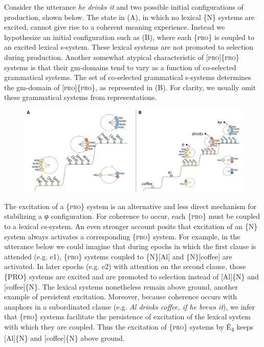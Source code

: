    Consider the utterance \textit{he drinks it} and two possible initial configurations of production, shown below. The state in (A), in which no lexical \{N\} systems are excited, cannot give rise to a coherent meaning experience. Instead we hypothesize an initial configuration such as (B), where each \{\textsc{pro}\} is coupled to an excited lexical s-system. These lexical systems are not promoted to selection during production. Another somewhat atypical characteristic of [\textsc{pro}]\{\textsc{pro}\} systems is that their gm-domains tend to vary as a function of co-selected grammatical systems. The set of co-selected grammatical s-systems determines the gm-domain of [\textsc{pro}]\{\textsc{pro}\}, as represented in (B). For clarity, we usually omit these grammatical systems from representations.   

  
\begin{figure}
\includegraphics[width=\textwidth]{figures/Tilsen-img152.png}
\caption{\missingcaption}
\label{fig:}
\end{figure}
 

  The excitation of a \{\textsc{pro}\} system is an alternative and less direct mechanism for stabilizing a φ configuration. For coherence to occur, each \{\textsc{pro}\} must be coupled to a lexical cs-system. An even stronger account posits that excitation of an \{N\} system always activates a corresponding \{\textsc{pro}\} system. For example, in the utterance below we could imagine that during epochs in which the first clause is attended (e.g. e1), \{\textsc{pro}\} systems coupled to \{N\}[Al] and \{N\}[coffee] are activated. In later epochs (e.g. e2) with attention on the second clause, those \{PRO\} systems are excited and are promoted to selection instead of [Al]\{N\} and [coffee]\{N\}. The lexical systems nonetheless remain above ground, another example of persistent excitation. Moreover, because coherence occurs with anaphors in a subordinated clause (e.g. \textit{Al drinks coffee, if he brews it}), we infer that \{\textsc{pro}\} systems facilitate the persistence of excitation of the lexical system with which they are coupled. Thus the excitation of \{\textsc{pro}\} systems by Ê\textsubscript{4} keeps [Al]\{N\} and [coffee]\{N\} above ground.

